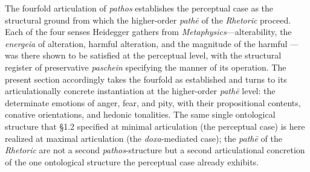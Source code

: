 \documentclass{article}
\begin{document}
The fourfold articulation of \textit{pathos} establishes the perceptual case as the structural ground from which the higher-order \textit{path\=e} of the \textit{Rhetoric} proceed. Each of the four senses Heidegger gathers from \textit{Metaphysics}---alterability, the \textit{energeia} of alteration, harmful alteration, and the magnitude of the harmful --- was there shown to be satisfied at the perceptual level, with the structural register of preservative \textit{paschein} specifying the manner of its operation. The present section accordingly takes the fourfold as established and turns to its articulationally concrete instantiation at the higher-order \textit{path\=e} level: the determinate emotions of anger, fear, and pity, with their propositional contents, conative orientations, and hedonic tonalities. The same single ontological structure that \S1.2 specified at minimal articulation (the perceptual case) is here realized at maximal articulation (the \textit{doxa}-mediated case); the \textit{path\=e} of the \textit{Rhetoric} are not a second \textit{pathos}-structure but a second articulational concretion of the one ontological structure the perceptual case already exhibits.
\end{document}
